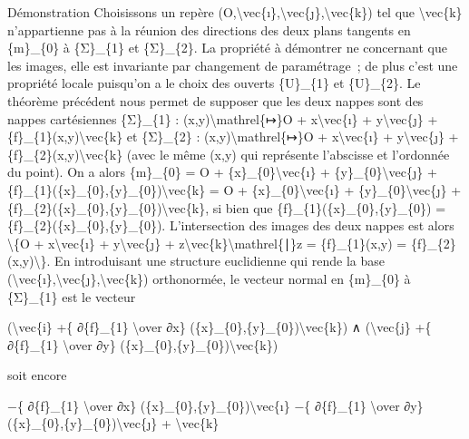 \documentclass[]{article}
\begin{document}
Démonstration Choisissons un repère
(O,\textbackslash{}vec\{ı\},\textbackslash{}vec\{ȷ\},\textbackslash{}vec\{k\})
tel que \textbackslash{}vec\{k\} n'appartienne pas à la réunion des
directions des deux plans tangents en \{m\}\_\{0\} à \{Σ\}\_\{1\} et
\{Σ\}\_\{2\}. La propriété à démontrer ne concernant que les images,
elle est invariante par changement de paramétrage~; de plus c'est une
propriété locale puisqu'on a le choix des ouverts \{U\}\_\{1\} et
\{U\}\_\{2\}. Le théorème précédent nous permet de supposer que les deux
nappes sont des nappes cartésiennes \{Σ\}\_\{1\} :
(x,y)\textbackslash{}mathrel\{↦\}O + x\textbackslash{}vec\{ı\} +
y\textbackslash{}vec\{ȷ\} + \{f\}\_\{1\}(x,y)\textbackslash{}vec\{k\} et
\{Σ\}\_\{2\} : (x,y)\textbackslash{}mathrel\{↦\}O +
x\textbackslash{}vec\{ı\} + y\textbackslash{}vec\{ȷ\} +
\{f\}\_\{2\}(x,y)\textbackslash{}vec\{k\} (avec le même (x,y) qui
représente l'abscisse et l'ordonnée du point). On a alors \{m\}\_\{0\} =
O + \{x\}\_\{0\}\textbackslash{}vec\{ı\} +
\{y\}\_\{0\}\textbackslash{}vec\{ȷ\} +
\{f\}\_\{1\}(\{x\}\_\{0\},\{y\}\_\{0\})\textbackslash{}vec\{k\} = O +
\{x\}\_\{0\}\textbackslash{}vec\{ı\} +
\{y\}\_\{0\}\textbackslash{}vec\{ȷ\} +
\{f\}\_\{2\}(\{x\}\_\{0\},\{y\}\_\{0\})\textbackslash{}vec\{k\}, si bien
que \{f\}\_\{1\}(\{x\}\_\{0\},\{y\}\_\{0\}) =
\{f\}\_\{2\}(\{x\}\_\{0\},\{y\}\_\{0\}). L'intersection des images des
deux nappes est alors \textbackslash{}\{O + x\textbackslash{}vec\{ı\} +
y\textbackslash{}vec\{ȷ\} +
z\textbackslash{}vec\{k\}\textbackslash{}mathrel\{∣\}z =
\{f\}\_\{1\}(x,y) = \{f\}\_\{2\}(x,y)\textbackslash{}\}. En introduisant
une structure euclidienne qui rende la base
(\textbackslash{}vec\{ı\},\textbackslash{}vec\{ȷ\},\textbackslash{}vec\{k\})
orthonormée, le vecteur normal en \{m\}\_\{0\} à \{Σ\}\_\{1\} est le
vecteur

(\textbackslash{}vec\{i\} +\{ ∂\{f\}\_\{1\} \textbackslash{}over ∂x\}
(\{x\}\_\{0\},\{y\}\_\{0\})\textbackslash{}vec\{k\}) ∧
(\textbackslash{}vec\{j\} +\{ ∂\{f\}\_\{1\} \textbackslash{}over ∂y\}
(\{x\}\_\{0\},\{y\}\_\{0\})\textbackslash{}vec\{k\})

soit encore

−\{ ∂\{f\}\_\{1\} \textbackslash{}over ∂x\}
(\{x\}\_\{0\},\{y\}\_\{0\})\textbackslash{}vec\{ı\} −\{ ∂\{f\}\_\{1\}
\textbackslash{}over ∂y\}
(\{x\}\_\{0\},\{y\}\_\{0\})\textbackslash{}vec\{ȷ\} +
\textbackslash{}vec\{k\}
\end{document}
